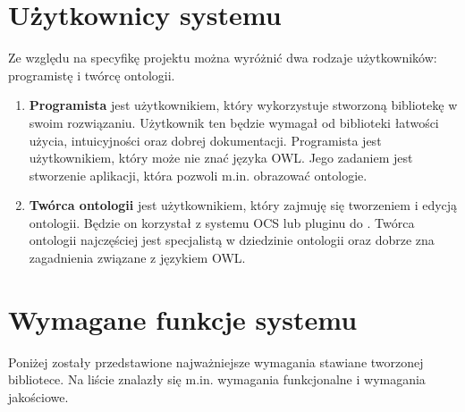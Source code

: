 \section{Użytkownicy systemu}
Ze względu na specyfikę projektu można wyróżnić dwa rodzaje użytkowników: programistę i twórcę ontologii. 
\begin{enumerate}
 \item {\bf Programista} jest użytkownikiem, który wykorzystuje stworzoną bibliotekę w swoim rozwiązaniu. Użytkownik ten będzie wymagał od biblioteki łatwości użycia, 
intuicyjności oraz dobrej dokumentacji. Programista jest użytkownikiem, który może nie znać języka OWL. Jego zadaniem jest stworzenie aplikacji, która pozwoli m.in.
 obrazować ontologie. 
 \item {\bf Twórca ontologii} jest użytkownikiem, który zajmuję się tworzeniem i edycją ontologii. Będzie on korzystał z systemu OCS lub pluginu do \protege. 
Twórca ontologii najczęściej jest specjalistą w dziedzinie ontologii oraz dobrze zna zagadnienia związane z językiem OWL. 
\end{enumerate}

\section{Wymagane funkcje systemu}
Poniżej zostały przedstawione najważniejsze wymagania stawiane tworzonej bibliotece. Na liście znalazły się m.in. wymagania funkcjonalne i wymagania jakościowe.

